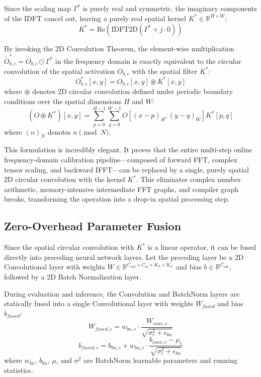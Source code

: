 \documentclass{article}
\theoremstyle{plain}
\theoremstyle{definition}
\theoremstyle{remark}
\begin{document}
Since the scaling map $\Gamma^*$ is purely real and symmetric, the imaginary components of the IDFT cancel out, leaving a purely real spatial kernel $K^* \in \mathbb{R}^{H \times W}$:
\begin{equation}
    K^* = \text{Re}\left(\text{IDFT2D}\left(\Gamma^* + j \cdot 0\right)\right)
\end{equation}

By invoking the 2D Convolution Theorem, the element-wise multiplication $\tilde{O}^*_{b,c} = \tilde{O}_{b,c} \odot \Gamma^*$ in the frequency domain is exactly equivalent to the circular convolution of the spatial activation $O_{b,c}$ with the spatial filter $K^*$:
\begin{equation}
    O^*_{b,c}[x, y] = O_{b,c}[x, y] \circledast K^*[x, y]
\end{equation}
where $\circledast$ denotes 2D circular convolution defined under periodic boundary conditions over the spatial dimensions $H$ and $W$:
\begin{equation}
    (O \circledast K^*)[x, y] = \sum_{p=0}^{H-1} \sum_{q=0}^{W-1} O[(x - p)_H, (y - q)_W] K^*[p, q]
\end{equation}
where $(n)_N$ denotes $n \pmod N$. 

This formulation is incredibly elegant. It proves that the entire multi-step online frequency-domain calibration pipeline—composed of forward FFT, complex tensor scaling, and backward IFFT—can be replaced by a single, purely spatial 2D circular convolution with the kernel $K^*$. This eliminates complex number arithmetic, memory-intensive intermediate FFT graphs, and compiler graph breaks, transforming the operation into a drop-in spatial processing step.

\subsection{Zero-Overhead Parameter Fusion}
Since the spatial circular convolution with $K^*$ is a linear operator, it can be fused directly into preceding neural network layers. Let the preceding layer be a 2D Convolutional layer with weights $W \in \mathbb{R}^{C_{out} \times C_{in} \times K_h \times K_w}$ and bias $b \in \mathbb{R}^{C_{out}}$, followed by a 2D Batch Normalization layer.

During evaluation and inference, the Convolution and BatchNorm layers are statically fused into a single Convolutional layer with weights $W_{fused}$ and bias $b_{fused}$:
\begin{equation}
    W_{fused, c} = w_{bn, c} \cdot \frac{W_{conv, c}}{\sqrt{\sigma^2_c + \epsilon_{bn}}}
\end{equation}
\begin{equation}
    b_{fused, c} = b_{bn, c} + w_{bn, c} \cdot \frac{b_{conv, c} - \mu_c}{\sqrt{\sigma^2_c + \epsilon_{bn}}}
\end{equation}
where $w_{bn}$, $b_{bn}$, $\mu$, and $\sigma^2$ are BatchNorm learnable parameters and running statistics.
\end{document}
